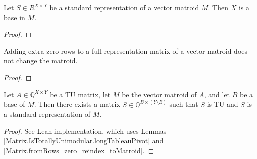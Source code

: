 \begin{lemma}
    \label{StandardRepr.toMatroid_isBase_X}
    \leanok
    Let $S \in R^{X \times Y}$ be a standard representation of a vector matroid $M$. Then $X$ is a base in $M$.
\end{lemma}

\begin{proof}
    \leanok
    \SeeLean
\end{proof}




\begin{lemma}
    \label{Matrix.fromRows_zero_reindex_toMatroid}
    \leanok
    Adding extra zero rows to a full representation matrix of a vector matroid does not change the matroid.
\end{lemma}

\begin{proof}
    \leanok
    \SeeLean
\end{proof}

\begin{lemma}
    \label{VectorMatroid.exists_standardRepr_isBase_isTotallyUnimodular}
    \leanok
    Let $A \in \mathbb{Q}^{X \times Y}$ be a TU matrix, let $M$ be the vector matroid of $A$, and let $B$ be a base of $M$. Then there exists a matrix $S \in \mathbb{Q}^{B \times (Y \setminus B)}$ such that $S$ is TU and $S$ is a standard representation of $M$.
\end{lemma}

\begin{proof}
    \leanok
    See Lean implementation, which uses Lemmas \ref{Matrix.IsTotallyUnimodular.longTableauPivot} and \ref{Matrix.fromRows_zero_reindex_toMatroid}.
\end{proof}

